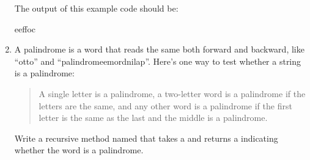 \begin{exercise}
\begin{enumerate}
The output of this example code should be:

\begin{stdout}
eeffoc
\end{stdout}


\item A palindrome is a word that reads the same both forward and backward, like ``otto'' and ``palindromeemordnilap''.
Here's one way to test whether a string is a palindrome:

\begin{quotation}
\noindent
A single letter is a palindrome, a two-letter word is a palindrome if the letters are the same, and any other word is a palindrome if the first letter is the same as the last and the middle is a palindrome.
\end{quotation}

Write a recursive method named  that takes a  and returns a  indicating whether the word is a palindrome.

\end{enumerate}

\end{exercise}
